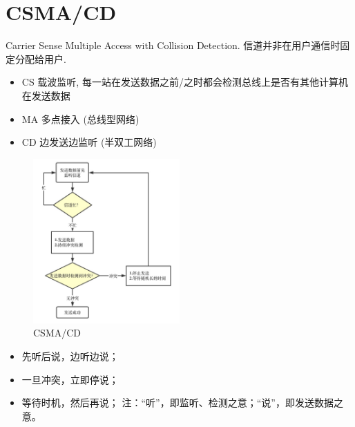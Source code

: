 \documentclass[a4paper]{report}
\begin{document}
\section{CSMA/CD}
Carrier Sense Multiple Access with Collision Detection. 信道并非在用户通信时固定分配给用户. 

\begin{itemize}
  \item CS 载波监听, 每一站在发送数据之前/之时都会检测总线上是否有其他计算机在发送数据
  \item MA 多点接入 (总线型网络)
  \item CD 边发送边监听 (半双工网络)
\end{itemize}

\begin{figure}[H]
\centering
\includegraphics[width=0.5\textwidth]{csma_cd.png}
\caption{CSMA/CD}
\end{figure}

\begin{itemize}
  \item 先听后说，边听边说；
  \item 一旦冲突，立即停说；
  \item 等待时机，然后再说；
  \subitem 注：“听”，即监听、检测之意；“说”，即发送数据之意。
\end{itemize}


\end{document}
